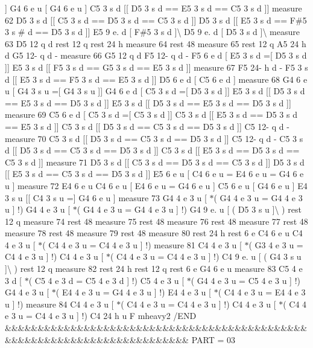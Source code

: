 \mbox{]} G4 6 e u \mbox{[} G4 6 e u \mbox{]} C5 3 s d \mbox{[}\mbox{[} D5 3 s d == E5 3 s d == C5 3 s d \mbox{]}\mbox{]} measure 62 D5 3 s d \mbox{[}\mbox{[} C5 3 s d == D5 3 s d == C5 3 s d \mbox{]}\mbox{]} D5 3 s d \mbox{[}\mbox{[} E5 3 s d == F\#5 3 s \# d == D5 3 s d \mbox{]}\mbox{]} E5 9 e. d \mbox{[} F\#5 3 s d \mbox{]}\textbackslash{} D5 9 e. d \mbox{[} D5 3 s d \mbox{]}\textbackslash{} measure 63 D5 12 q d rest 12 q rest 24 h measure 64 rest 48 measure 65 rest 12 q A5 24 h d G5 12-\/ q d -\/ measure 66 G5 12 q d F5 12-\/ q d -\/ F5 6 e d \mbox{[} E5 3 s d =\mbox{[} D5 3 s d \mbox{]}\mbox{]} E5 3 s d \mbox{[}\mbox{[} F5 3 s d == G5 3 s d == E5 3 s d \mbox{]}\mbox{]} measure 67 F5 24-\/ h d -\/ F5 3 s d \mbox{[}\mbox{[} E5 3 s d == F5 3 s d == E5 3 s d \mbox{]}\mbox{]} D5 6 e d \mbox{[} C5 6 e d \mbox{]} measure 68 G4 6 e u \mbox{[} G4 3 s u =\mbox{[} G4 3 s u \mbox{]}\mbox{]} G4 6 e d \mbox{[} C5 3 s d =\mbox{[} D5 3 s d \mbox{]}\mbox{]} E5 3 s d \mbox{[}\mbox{[} D5 3 s d == E5 3 s d == D5 3 s d \mbox{]}\mbox{]} E5 3 s d \mbox{[}\mbox{[} D5 3 s d == E5 3 s d == D5 3 s d \mbox{]}\mbox{]} measure 69 C5 6 e d \mbox{[} C5 3 s d =\mbox{[} C5 3 s d \mbox{]}\mbox{]} C5 3 s d \mbox{[}\mbox{[} E5 3 s d == D5 3 s d == E5 3 s d \mbox{]}\mbox{]} C5 3 s d \mbox{[}\mbox{[} D5 3 s d == C5 3 s d == D5 3 s d \mbox{]}\mbox{]} C5 12-\/ q d -\/ measure 70 C5 3 s d \mbox{[}\mbox{[} D5 3 s d == C5 3 s d == D5 3 s d \mbox{]}\mbox{]} C5 12-\/ q d -\/ C5 3 s d \mbox{[}\mbox{[} D5 3 s d == C5 3 s d == D5 3 s d \mbox{]}\mbox{]} C5 3 s d \mbox{[}\mbox{[} E5 3 s d == D5 3 s d == C5 3 s d \mbox{]}\mbox{]} measure 71 D5 3 s d \mbox{[}\mbox{[} C5 3 s d == D5 3 s d == C5 3 s d \mbox{]}\mbox{]} D5 3 s d \mbox{[}\mbox{[} E5 3 s d == C5 3 s d == D5 3 s d \mbox{]}\mbox{]} E5 6 e u \mbox{[} C4 6 e u = E4 6 e u = G4 6 e u \mbox{]} measure 72 E4 6 e u C4 6 e u \mbox{[} E4 6 e u = G4 6 e u \mbox{]} C5 6 e u \mbox{[} G4 6 e u \mbox{]} E4 3 s u \mbox{[}\mbox{[} C4 3 s u =\mbox{]} G4 6 e u \mbox{]} measure 73 G4 4 e 3 u \mbox{[} $\ast$( G4 4 e 3 u = G4 4 e 3 u \mbox{]} !) G4 4 e 3 u \mbox{[} $\ast$( G4 4 e 3 u = G4 4 e 3 u \mbox{]} !) G4 9 e. u \mbox{[} ( D5 3 s u \mbox{]}\textbackslash{} ) rest 12 q measure 74 rest 48 measure 75 rest 48 measure 76 rest 48 measure 77 rest 48 measure 78 rest 48 measure 79 rest 48 measure 80 rest 24 h rest 6 e C4 6 e u C4 4 e 3 u \mbox{[} $\ast$( C4 4 e 3 u = C4 4 e 3 u \mbox{]} !) measure 81 C4 4 e 3 u \mbox{[} $\ast$( G3 4 e 3 u = C4 4 e 3 u \mbox{]} !) C4 4 e 3 u \mbox{[} $\ast$( C4 4 e 3 u = C4 4 e 3 u \mbox{]} !) C4 9 e. u \mbox{[} ( G4 3 s u \mbox{]}\textbackslash{} ) rest 12 q measure 82 rest 24 h rest 12 q rest 6 e G4 6 e u measure 83 C5 4 e 3 d \mbox{[} $\ast$( C5 4 e 3 d = C5 4 e 3 d \mbox{]} !) C5 4 e 3 u \mbox{[} $\ast$( G4 4 e 3 u = C5 4 e 3 u \mbox{]} !) G4 4 e 3 u \mbox{[} $\ast$( E4 4 e 3 u = G4 4 e 3 u \mbox{]} !) E4 4 e 3 u \mbox{[} $\ast$( C4 4 e 3 u = E4 4 e 3 u \mbox{]} !) measure 84 C4 4 e 3 u \mbox{[} $\ast$( C4 4 e 3 u = C4 4 e 3 u \mbox{]} !) C4 4 e 3 u \mbox{[} $\ast$( C4 4 e 3 u = C4 4 e 3 u \mbox{]} !) C4 24 h u F mheavy2 /\+E\+ND \&\&\&\&\&\&\&\&\&\&\&\&\&\&\&\&\&\&\&\&\&\&\&\&\&\&\&\&\&\&\&\&\&\&\&\&\&\&\&\&\&\&\&\&\&\&\&\&\&\&\&\&\&\&\&\&\&\&\&\&\&\&\&\&\&\&\&\&\&\&\&\&\&\& P\+A\+RT = 03 